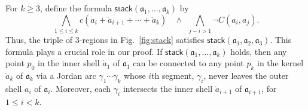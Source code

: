 \documentclass{article}
\newcommand{\tseq}[1]{\mathfrak{#1}}
\newcommand{\intermediate}[1]{\dot{#1}}
\newcommand{\inner}[1]{\ddot{#1}}
\newcommand{\stack}{\mathsf{stack}}
\begin{document}
For $k \geq 3$, define the formula $\stack(\tseq{a}_1, \ldots,
\tseq{a}_k)$ by 
\begin{equation*}
\bigwedge_{1 \leq i \leq k}
     c(\intermediate{a}_i + \inner{a}_{i + 1} + \cdots + \inner{a}_k) \ \  \ \ 
\land \ \ 
\bigwedge_{j - i > 1} \neg C(a_i,a_j).
\end{equation*}
Thus, the triple of 3-regions in Fig.~\ref{fig:stack} satisfies
$\stack(\tseq{a}_1, \tseq{a}_2, \tseq{a}_3)$. This formula plays a
crucial role in our proof.  If $\stack(\tseq{a}_1,\ldots,\tseq{a}_k)$
holds, then any point $p_0$ in the inner shell $\intermediate{a}_1$ of
$\tseq{a}_1$ can be connected to any point $p_k$ in the kernel
$\inner{a}_k$ of $\tseq{a}_k$ via a Jordan arc
$\gamma_1\cdots\gamma_k$ whose $i$th segment, $\gamma_i$, never leaves
the outer shell $a_i$ of $\tseq{a}_i$. Moreover, each $\gamma_i$
intersects the inner shell $\intermediate{a}_{i+1}$ of
$\tseq{a}_{i+1}$, for $1 \leq i <k$.
\end{document}

